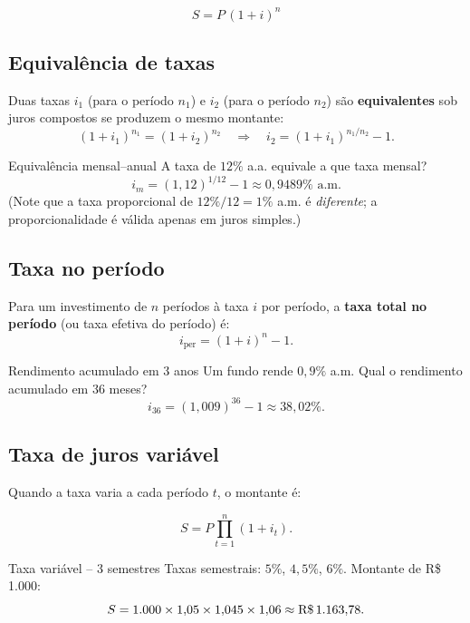 \begin{resultado}
\[
  \boxed{S = P\,(1+i)^n}
\]
\end{resultado}

\subsection{Equivalência de taxas}

Duas taxas $i_1$ (para o período $n_1$) e $i_2$ (para o período $n_2$) são \textbf{equivalentes} sob juros compostos se produzem o mesmo montante:
\[
  (1+i_1)^{n_1} = (1+i_2)^{n_2}
  \quad\Rightarrow\quad
  i_2 = (1+i_1)^{n_1/n_2} - 1.
\]

\begin{exemplo}{Equivalência mensal--anual}
A taxa de $12\%$ a.a. equivale a que taxa mensal?
\[
  i_m = (1{,}12)^{1/12} - 1 \approx 0{,}9489\% \text{ a.m.}
\]
(Note que a taxa proporcional de $12\%/12 = 1\%$ a.m. é \emph{diferente}; a proporcionalidade é válida apenas em juros simples.)
\end{exemplo}

\subsection{Taxa no período}

Para um investimento de $n$ períodos à taxa $i$ por período, a \textbf{taxa total no período} (ou taxa efetiva do período) é:
\[
  i_{\text{per}} = (1+i)^n - 1.
\]

\begin{exemplo}{Rendimento acumulado em 3 anos}
Um fundo rende $0{,}9\%$ a.m. Qual o rendimento acumulado em 36 meses?
\[
  i_{36} = (1{,}009)^{36} - 1 \approx 38{,}02\%.
\]
\end{exemplo}

\subsection{Taxa de juros variável}

Quando a taxa varia a cada período $t$, o montante é:
\begin{resultado}
\[
  S = P \prod_{t=1}^{n}(1+i_t).
\]
\end{resultado}

\begin{exemplo}{Taxa variável -- 3 semestres}
Taxas semestrais: $5\%$, $4{,}5\%$, $6\%$. Montante de R\$\,1.000:
\[
  S = 1{.}000 \times 1{,}05 \times 1{,}045 \times 1{,}06 \approx \text{R\$\,}1.163{,}78.
\]
\end{exemplo}

